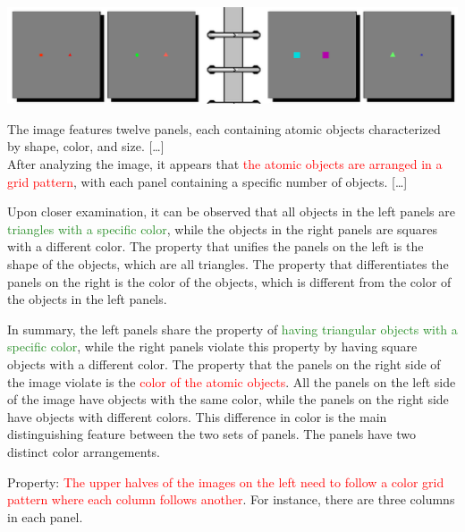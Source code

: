 \begin{tcolorbox}[breakable,enhanced jigsaw,opacityback=0,]
	\footnotesize
	\centering
	\includegraphics[width=.8\linewidth]{imgs/kandy/Fig6.png}\\
	\begin{dialogue}
		 The image features twelve panels, each containing atomic objects characterized by shape, color, and size. [\dots]
		\\
		 After analyzing the image, it appears that \textcolor{red}{the atomic objects are arranged in a grid pattern}, with each panel containing a specific number of objects. [\dots]
		
		Upon closer examination, it can be observed that all objects in the left panels are \textcolor{ForestGreen}{triangles with a specific color}, while the objects in the right panels are squares with a different color. The property that unifies the panels on the left is the shape of the objects, which are all triangles. The property that differentiates the panels on the right is the color of the objects, which is different from the color of the objects in the left panels.
		
		In summary, the left panels share the property of \textcolor{ForestGreen}{having triangular objects with a specific color}, while the right panels violate this property by having square objects with a different color.
		\vspace{1em}
		 The property that the panels on the right side of the image violate is the \textcolor{red}{color of the atomic objects}. All the panels on the left side of the image have objects with the same color, while the panels on the right side have objects with different colors. This difference in color is the main distinguishing feature between the two sets of panels.
		\vspace{1em}
		 The panels have two distinct color arrangements.
		
		Property: \textcolor{red}{The upper halves of the images on the left need to follow a color grid pattern where each column follows another}. For instance, there are three columns in each panel.
		

\end{dialogue}
\end{tcolorbox}
